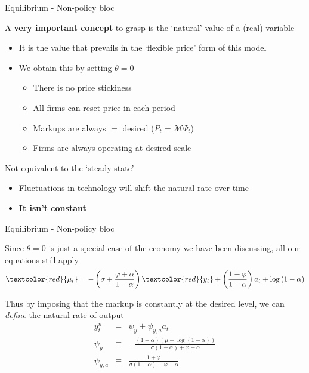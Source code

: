 \documentclass{beamer}
\begin{document}
\begin{frame}{Equilibrium - Non-policy bloc}

A \textbf{very important concept} to grasp is the `natural' value of a (real) variable
\begin{itemize}
\item	It is the value that prevails in the `flexible price' form of this model
\item	We obtain this by setting $\theta=0$
	\begin{itemize}
	\item	There is no price stickiness
	\item	All firms can reset price in each period
	\item	Markups are always $=$ desired ($P_{t}=\mathcal{M}\Psi_{t}$)
	\item	Firms are always operating at desired scale
	\end{itemize}
\end{itemize}

\vspace{2mm}
Not equivalent to the `steady state'
\begin{itemize}
\item	Fluctuations in technology will shift the natural rate over time
\item	\textbf{It isn't constant}
\end{itemize}

\end{frame}


	
\begin{frame}{Equilibrium - Non-policy bloc}

Since $\theta=0$ is just a special case of the economy we have been discussing, all our equations still apply
\[
\textcolor{red}{\mu_{t}} = - \left( \sigma + \frac{\varphi + \alpha}{1-\alpha} \right)\textcolor{red}{y_{t}} + \left( \frac{1+\varphi}{1-\alpha} \right)a_{t}+ \log{(1-\alpha)}
\]

Thus by imposing that the markup is constantly at the desired level, we can \emph{define} the natural rate of output
\begin{eqnarray}
y^{n}_{t} 	&=& 		\psi_{y} + \psi_{y,a} a_{t} \nonumber \\
\psi_{y} 	&\equiv& 	-\frac{(1-\alpha)(\mu-\log{(1-\alpha)})}{\sigma(1-\alpha)+\varphi+\alpha} \nonumber \\
\psi_{y,a}	&\equiv& 	\frac{1+\varphi}{\sigma(1-\alpha) + \varphi + \alpha} \nonumber
\end{eqnarray}

\end{frame}
\end{document}
